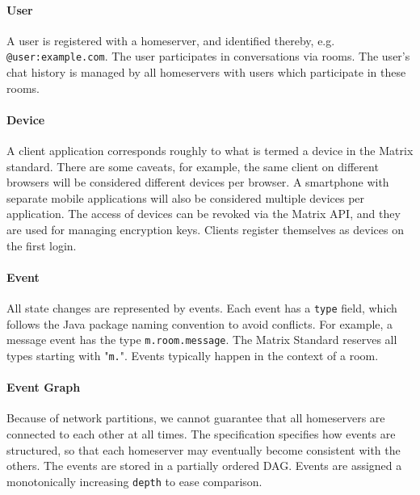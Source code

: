 \paragraph{User}
A user is registered with a homeserver, and identified thereby, e.g. \texttt{@user:example.com}.
The user participates in conversations via rooms.
The user's chat history is managed by all homeservers with users which participate in these rooms.

\paragraph{Device}
A client application corresponds roughly to what is termed a device in the Matrix standard.
There are some caveats, for example, the same client on different browsers will be considered different devices per browser.
A smartphone with separate mobile applications will also be considered multiple devices per application.
The access of devices can be revoked via the Matrix \ac{API}, and they are used for managing encryption keys.
Clients register themselves as devices on the first login.

\paragraph{Event}
All state changes are represented by events.
Each event has a \texttt{type} field, which follows the Java package naming convention to avoid conflicts.
For example, a message event has the type \texttt{m.room.message}.
The Matrix Standard reserves all types starting with "\texttt{m.}".
Events typically happen in the context of a room.

\paragraph{Event Graph}
Because of network partitions, we cannot guarantee that all homeservers are connected to each other at all times.
The specification specifies how events are structured, so that each homeserver may eventually become consistent with the others.
The events are stored in a partially ordered \ac{DAG}.
Events are assigned a monotonically increasing \texttt{depth} to ease comparison.

